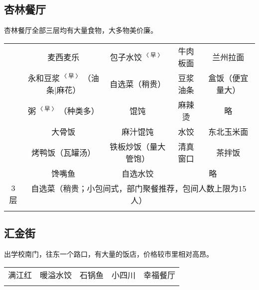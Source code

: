 \subsection[杏林餐厅]{杏林餐厅}
\vspace{-1em}
杏林餐厅全部三层均有大量食物，大多物美价廉。
\newpage
\begin{table}[ht]
    \centering
    \begin{tabular}{|c|c|c|c|c|}
        \Xhline{1.2pt}
        \multirow{3}{*}{1层} & 麦西麦乐                                                & 包子水饺$^{〈早〉}$ & 牛肉板面                   & 兰州拉面     \\
        \cline{2-5}
                            & 永和豆浆$^{〈早〉}$（油条|麻花）                                 & 自选菜（稍贵）      & 豆浆油条                   & 盒饭（便宜量大） \\
        \cline{2-5}
                            & 粥$^{〈早〉}$（种类多）                                      & 馄饨           & 麻辣烫                    & 略        \\
        \Xhline{1.2pt}
        \multirow{3}{*}{2层} & 大骨饭                                                 & 麻汁馄饨         & 水饺                     & 东北玉米面    \\
        \cline{2-5}
                            & 烤鸭饭（瓦罐汤）                                            & 铁板炒饭（量大管饱）   & 清真窗口                   & 茶拌饭      \\
        \cline{2-5}
                            & 馋嘴鱼                                                 & 自选水饺         & \multicolumn{2}{c|}{略}            \\
        \Xhline{1.2pt}
        3层\footnotemark     & \multicolumn{4}{c|}{自选菜（稍贵；小包间式，部门聚餐推荐，包间人数上限为15人）}                                                    \\
        \Xhline{1.2pt}
    \end{tabular}
\end{table}

\subsection[汇金街]{汇金街\footnotemark}
出学校南门，往东一个路口，有大量的饭店，价格较市里相对高昂。
\begin{table}[ht]
    \centering
    \begin{tabular}{|c|c|c|c|c|}
        \Xhline{1.2pt}
        满江红 & 暖溢水饺 & 石锅鱼 & 小四川 & 幸福餐厅 \\
        \Xhline{1.2pt}
    \end{tabular}
\end{table}


